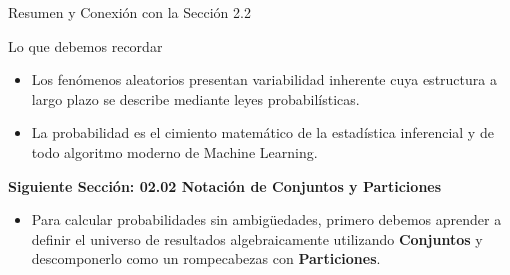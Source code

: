\begin{frame}{Resumen y Conexión con la Sección 2.2}
  \begin{block}{Lo que debemos recordar}
    \begin{itemize}
      \item Los fenómenos aleatorios presentan variabilidad inherente cuya estructura a largo plazo se describe mediante leyes probabilísticas. \pause
      \item La probabilidad es el cimiento matemático de la estadística inferencial y de todo algoritmo moderno de Machine Learning.
    \end{itemize}
  \end{block}
  
  \vspace{0.8em}
  \pause
  {\large \color{TecAzulOscuro}\textbf{Siguiente Sección: 02.02 Notación de Conjuntos y Particiones}}
  \vspace{0.3em}
  \begin{itemize}
    \item Para calcular probabilidades sin ambigüedades, primero debemos aprender a definir el universo de resultados algebraicamente utilizando \textbf{Conjuntos} y descomponerlo como un rompecabezas con \textbf{Particiones}.
  \end{itemize}
\end{frame}


